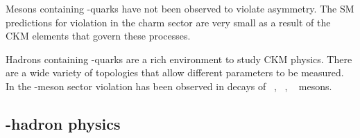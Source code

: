 Mesons containing \cquark-quarks have not been observed to violate \CP asymmetry. The SM predictions for \CP violation in the charm sector are very small as a result of the CKM elements that govern these processes.     

Hadrons containing \bquark-quarks are a rich environment to study CKM physics. 
There are a wide variety of topologies that allow different parameters to be measured. 
In the \bquark-meson sector \CP violation has been observed in decays of \Bp~\cite{PhysRevD.82.072004,PhysRevD.81.112002}, \Bz~\cite{PhysRevLett.87.091801,PhysRevLett.87.091802}, \Bs~\cite{PhysRevLett.110.221601} mesons.

\subsection{\bquark-hadron physics}

